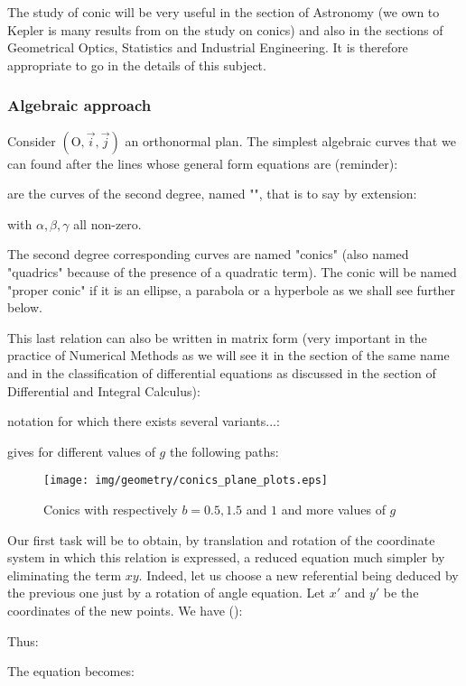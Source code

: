 	The study of conic will be very useful in the section of Astronomy (we own to Kepler is  many results from on the study on conics) and also in the sections of Geometrical Optics, Statistics and Industrial Engineering. It is therefore appropriate to go in the details of this subject.

	\subsubsection{Algebraic approach}
	Consider $(\text{O},\vec{i},\vec{j})$ an orthonormal plan. The simplest algebraic curves that we can found after the lines whose general form equations are (reminder):
	
are the curves of the second degree, named "", that is to say by extension:
	
with $\alpha,\beta,\gamma$ all non-zero.

	The second degree corresponding curves are named "conics" (also named "quadrics\label{quadrics}" because of the presence of a quadratic term). The conic will be named "proper conic" if it is an ellipse, a parabola or a hyperbole as we shall see further below.

This last relation can also be written in matrix form (very important in the practice of Numerical Methods as we will see it in the section of the same name and in the classification of differential equations as discussed in the section of Differential and Integral Calculus):
	
notation for which there exists several variants...:
	

	gives for different values of $g$ the following paths:
	\begin{figure}[H]
		\centering
		\texttt{[image: img/geometry/conics\_plane\_plots.eps]}
		\caption{Conics with respectively $b=0.5, 1.5$ and $1$ and more values of $g$}
	\end{figure}
	Our first task will be to obtain, by translation and rotation of the coordinate system in which this relation is expressed, a reduced equation much simpler by eliminating the term $xy$. Indeed, let us choose a new referential being deduced by the previous one just by a rotation of angle equation. Let $x'$ and $y'$ be the coordinates of the new points. We have ():
	
Thus:
	
The equation becomes:
	
